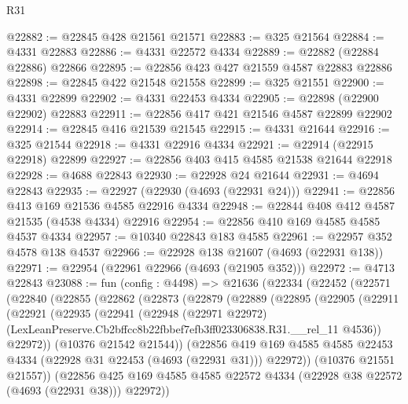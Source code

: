 \begin{lexlean}{R31}
\begin{coremodule}
@22882 := @22845 @428 @21561 @21571
@22883 := @325 @21564
@22884 := @4331 @22883
@22886 := @4331 @22572 @4334
@22889 := @22882 (@22884 @22886) @22866
@22895 := @22856 @423 @427 @21559 @4587 @22883 @22886
@22898 := @22845 @422 @21548 @21558
@22899 := @325 @21551
@22900 := @4331 @22899
@22902 := @4331 @22453 @4334
@22905 := @22898 (@22900 @22902) @22883
@22911 := @22856 @417 @421 @21546 @4587 @22899 @22902
@22914 := @22845 @416 @21539 @21545
@22915 := @4331 @21644
@22916 := @325 @21544
@22918 := @4331 @22916 @4334
@22921 := @22914 (@22915 @22918) @22899
@22927 := @22856 @403 @415 @4585 @21538 @21644 @22918
@22928 := @4688 @22843
@22930 := @22928 @24 @21644
@22931 := @4694 @22843
@22935 := @22927 (@22930 (@4693 (@22931 @24)))
@22941 := @22856 @413 @169 @21536 @4585 @22916 @4334
@22948 := @22844 @408 @412 @4587 @21535 (@4538 @4334) @22916
@22954 := @22856 @410 @169 @4585 @4585 @4537 @4334
@22957 := @10340 @22843 @183 @4585
@22961 := @22957 @352 @4578 @138 @4537
@22966 := @22928 @138 @21607 (@4693 (@22931 @138))
@22971 := @22954 (@22961 @22966 (@4693 (@21905 @352)))
@22972 := @4713 @22843
@23088 := fun (config : @4498) =>
  @21636
    (@22334
      (@22452
        (@22571
          (@22840
            (@22855
              (@22862
                (@22873
                  (@22879
                    (@22889
                      (@22895
                        (@22905
                          (@22911
                            (@22921
                              (@22935
                                (@22941
                                  (@22948
                                    (@22971 @22972)
                                    (LexLeanPreserve.Cb2bffcc8b22fbbef7efb3ff023306838.R31.__rel_11
                                      @4536))
                                  @22972))
                              (@10376 @21542 @21544))
                            (@22856
                              @419
                              @169
                              @4585
                              @4585
                              @22453
                              @4334
                              (@22928 @31 @22453 (@4693 (@22931 @31)))
                              @22972))
                          (@10376 @21551 @21557))
                        (@22856
                          @425
                          @169
                          @4585
                          @4585
                          @22572
                          @4334
                          (@22928 @38 @22572 (@4693 (@22931 @38)))
                          @22972))

\end{coremodule}
\end{lexlean}
